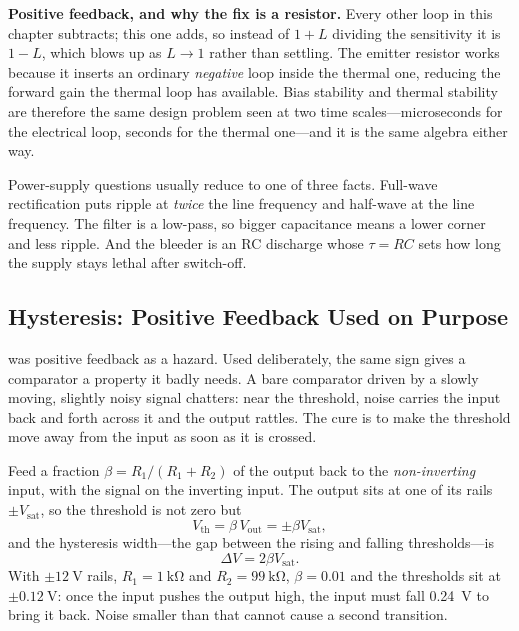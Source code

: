 \begin{controlsbox}
\textbf{Positive feedback, and why the fix is a resistor.} Every other loop in this
chapter subtracts; this one adds, so instead of \(1+L\) dividing the sensitivity it is
\(1-L\), which blows up as \(L\to1\) rather than settling. The emitter resistor works
because it inserts an ordinary \emph{negative} loop inside the thermal one, reducing
the forward gain the thermal loop has available. Bias stability and thermal stability
are therefore the same design problem seen at two time scales---microseconds for the
electrical loop, seconds for the thermal one---and it is the same algebra either way.
\end{controlsbox}

\begin{exambox}
Power-supply questions usually reduce to one of three facts. Full-wave rectification
puts ripple at \emph{twice} the line frequency and half-wave at the line frequency.
The filter is a low-pass, so bigger capacitance means a lower corner and less
ripple. And the bleeder is an RC discharge whose \(\tau=RC\) sets how long the supply
stays lethal after switch-off.
\end{exambox}

\subsection{Hysteresis: Positive Feedback Used on Purpose}
\label{sec:hysteresis}
 was positive feedback as a hazard. Used deliberately, the
same sign gives a comparator a property it badly needs. A bare comparator driven by a
slowly moving, slightly noisy signal chatters: near the threshold, noise carries the
input back and forth across it and the output rattles. The cure is to make the
threshold move away from the input as soon as it is crossed.

Feed a fraction \(\beta=R_1/(R_1+R_2)\) of the output back to the \emph{non-inverting}
input, with the signal on the inverting input. The output sits at one of its rails
\(\pm V_{\text{sat}}\), so the threshold is not zero but
\[
V_{\text{th}}=\beta\,V_{\text{out}}=\pm\beta V_{\text{sat}},
\]
and the hysteresis width---the gap between the rising and falling thresholds---is
\[
\Delta V=2\beta V_{\text{sat}} .
\]
With \(\pm\SI{12}{\volt}\) rails, \(R_1=\SI{1}{\kilo\ohm}\) and
\(R_2=\SI{99}{\kilo\ohm}\), \(\beta=0.01\) and the thresholds sit at
\(\pm\SI{0.12}{\volt}\): once the input pushes the output high, the input must fall
\SI{0.24}{\volt} to bring it back. Noise smaller than that cannot cause a second
transition.

